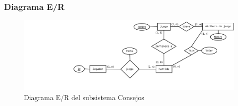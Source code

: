 \subsubsection{Diagrama E/R}

\begin{figure}[H]
\centering
\includegraphics[width=0.9\linewidth]{../Diagramas/pdf/Consejos/ERConsejos.pdf}
\caption{Diagrama E/R del subsistema Consejos}
\end{figure}
